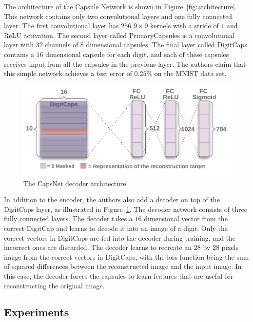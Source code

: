 \documentclass{article}
\begin{document}
The architecture of the Capsule Network is shown in Figure~\ref{fig:architecture}. This network contains only two convolutional layers and one fully connected layer. The first convolutional layer has $256$ $9\times 9$ kernels with a stride of $1$ and ReLU activation. The second layer called PrimaryCapsules is a convolutional layer with $32$ channels of $8$ dimensional capsules. The final layer called DigitCaps contains a $16$ dimensional capsule for each digit, and each of these capsules receives input from all the capsules in the previous layer. The authors claim that this simple network achieves a test error of $0.25\%$ on the MNIST data set. 

\begin{figure}[!htb]
	\centering\includegraphics[width=.8\textwidth]{fig/decoder}
	\caption{The CapsNet decoder architecture.}\label{fig:decoder}
\end{figure}

In addition to the encoder, the authors also add a decoder on top of the DigitCaps layer, as illustrated in Figure~\ref{fig:decoder}. The decoder network consists of three fully connected layers. The decoder takes a $16$ dimensional vector from the correct DigitCap and learns to decode it into an image of a digit. Only the correct vectors in DigitCaps are fed into the decoder during training, and the incorrect ones are discarded. The decoder learns to recreate an 28 by 28 pixels image from the correct vectors in DigitCaps, with the loss function being the sum of squared differences between the reconstructed image and the input image. In this case, the decoder forces the capsules to learn features that are useful for reconstructing the original image. 

\subsection{Experiments}
\end{document}
